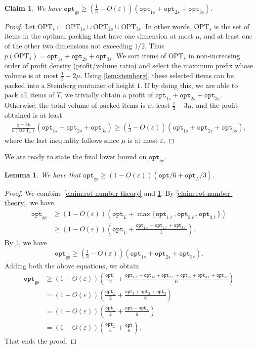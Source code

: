 \documentclass[10pt,a4paper]{amsart}
\newcommand{\kvnr}[1]{}
\newcommand{\eps}{\varepsilon}
\renewcommand{\epsilon}{\varepsilon} %
\newtheorem{lemma}[theorem]{Lemma}
\newtheorem{claim}[theorem]{Claim}
\theoremstyle{definition}
\newcommand{\alg}{\mathtt{opt}_{\mathrm{gs}}}
\newcommand{\opt}{\mathtt{opt}}
\newcommand{\optgs}{\mathtt{opt}_{\mathrm{gs}}}
\newcommand{\OPT}{\mathrm{OPT}}
\begin{document}
\begin{claim}
    \label{claim:rot-stein-gs}
    We have $\displaystyle \optgs\ge \left(\frac13-O(\eps)\right)(\opt_{1s}+\opt_{2s}+\opt_{3s})$.
\end{claim}
\begin{proof}
    Let $\OPT_s\coloneqq \OPT_{1s}\cup \OPT_{2s}\cup\OPT_{3s}$. In other words, $\OPT_s$ is the set of items in the optimal packing that have one dimension at most
$\mu$, and at least one of the other two dimensions not exceeding $1/2$. Thus $p(\OPT_s) = \opt_{1s}+\opt_{2s}+\opt_{3s}$. We sort items of $\OPT_s$ in non-increasing order
of profit density (profit/volume ratio) and select the maximum prefix whose volume is at most $\frac{1}{3}-2\mu$. Using \cref{lem:steinberg}, these selected items can be packed into a 
Steinberg container of height $1$. If by doing this, we are able to pack all items of $T$, we trivially obtain a profit of 
$\opt_{1s}+\opt_{2s}+\opt_{3s}$. Otherwise, the total volume of packed items is at least $\frac{1}{3}-3\mu$, and the profit obtained is at least 
\begin{align*}
    \frac{\frac{1}{3}-3\mu}{v(\OPT_s)}(\opt_{1s}+\opt_{2s}+\opt_{3s}) \ge \left(\frac{1}{3}-O(\epsilon)\right)(\opt_{1s}+\opt_{2s}+\opt_{3s}),
\end{align*}
where the last inequality follows since $\mu$ is at most $\eps$.
\end{proof}
We are ready to state the final lower bound on $\optgs$.
\begin{lemma}
\label{lem:containerrotation}
    We have that $\alg \ge (1-O(\epsilon))({\opt}/{6}+{\opt_L}/{3})$.
\end{lemma}
\begin{proof}
    We combine \cref{claim:rot-number-theory} and \cref{claim:rot-stein-gs}. By \cref{claim:rot-number-theory}, we have
    \begin{align*}
        \optgs&\ge (1-O(\eps))(\opt_L+\max\{\opt_{1\ell},\opt_{2\ell},\opt_{3\ell}\})\\
                &\ge (1-O(\eps))\left(\opt_L+\frac{\opt_{1\ell}+\opt_{2\ell}+\opt_{3\ell}}{3}\right).
    \end{align*}
    By \cref{claim:rot-stein-gs}, we have
    \begin{align*}
        \optgs\ge \left(\frac13-O(\eps)\right)(\opt_{1s}+\opt_{2s}+\opt_{3s}).
    \end{align*}
    Adding both the above equations, we obtain
    \begin{align*}
        \optgs&\ge(1-O(\eps))\left(\frac{\opt_L}{2}+\frac{\opt_{1\ell}+\opt_{1s}+\opt_{2\ell}+\opt_{2s}+\opt_{3\ell}+\opt_{3s}}{6}\right)\\
                &=(1-O(\eps))\left(\frac{\opt_L}{2}+\frac{\opt_1+\opt_2+\opt_3}{6}\right)\\
                &=(1-O(\eps))\left(\frac{\opt_L}{2}+\frac{\opt-\opt_L}{6}\right)\\
                &=(1-O(\eps))\left(\frac{\opt_L}{3}+\frac{\opt}{6}\right).
    \end{align*}    
    That ends the proof.
\end{proof}
\end{document}
